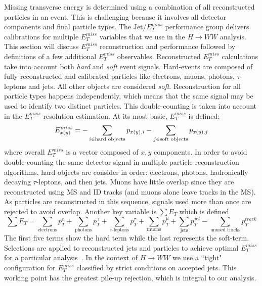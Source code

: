 Missing transverse energy is determined using a combination of all reconstructed particles in an event. This is challenging because it involves all detector components and final particle types. The Jet/$E_T^{miss}$ performance group delivers calibrations for multiple $E_T^{miss}$ variables that we use in the $H\rightarrow WW$ analysis. This section will discuss $E_T^{miss}$ reconstruction and performance followed by definitions of a few additional $E_T^{miss}$ observables. 
Reconstructed $E_T^{miss}$ calculations take into account both \textit{hard} and \textit{soft} event signals. Hard-events are composed of fully reconstructed and calibrated particles like electrons, muons, photons, $\tau$-leptons and jets. All other objects are considered \textit{soft}. Reconstruction for all particle types happens independently, which means that the same signal may be used to identify two distinct particles. This double-counting is taken into account in the $E_T^{miss}$ resolution estimation. At its most basic, $E_T^{miss}$ is defined:
\begin{equation}
E_{x(y)}^{miss}=-\sum_{i\in{\textnormal{hard objects}}}p_{x(y),i} -\sum_{j\in{\textnormal{soft objects}}}p_{x(y),j}
\end{equation}
where overall $E_T^{miss}$ is a vector composed of $x,y$ components. In order to avoid double-counting the same detector signal in multiple particle reconstruction algorithms, hard objects are consider in order: electrons, photons, hadronically decaying $\tau$-leptons, and then jets. Muons have little overlap since they are reconstructed using MS and ID tracks (and muons alone leave tracks in the MS). As particles are reconstructed in this sequence, signals used more than once are rejected to avoid overlap. Another key variable is $\sum E_T$ which is defined
\begin{equation}
\sum E_T = \sum_{\text{electrons}} p_T^e + \sum_{\text{photons}} p_T^\gamma + \sum_{\text{$\tau$-leptons}} p_T^\tau + \sum_{\text{muons}} p_T^\mu + \sum_{\text{jets}} p_T^{jet} - \sum_{\text{unused tracks}} p_T^{track}
\end{equation}
The first five terms show the hard term while the last represents the soft-term. Selections are applied to reconstructed jets and particles to achieve optimal $E_T^{miss}$ for a particular analysis~\cite{METPerf}. In the context of $H\rightarrow WW$ we use a ``tight" configuration for $E_T^{miss}$ classified by strict conditions on accepted jets. This working point has the greatest pile-up rejection, which is integral to our analysis. 

